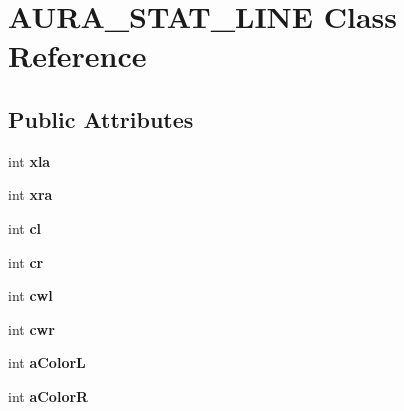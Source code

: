 \hypertarget{class_a_u_r_a___s_t_a_t___l_i_n_e}{\section{A\+U\+R\+A\+\_\+\+S\+T\+A\+T\+\_\+\+L\+I\+N\+E Class Reference}
\label{class_a_u_r_a___s_t_a_t___l_i_n_e}
}
\subsection*{Public Attributes}
\begin{DoxyCompactItemize}
\item 
\hypertarget{class_a_u_r_a___s_t_a_t___l_i_n_e_a42c234346457efdd753d71f9305fcf77}{int {\bfseries xla}}\label{class_a_u_r_a___s_t_a_t___l_i_n_e_a42c234346457efdd753d71f9305fcf77}

\item 
\hypertarget{class_a_u_r_a___s_t_a_t___l_i_n_e_a762bbdc4a68ca7a4840af6a0dde12bce}{int {\bfseries xra}}\label{class_a_u_r_a___s_t_a_t___l_i_n_e_a762bbdc4a68ca7a4840af6a0dde12bce}

\item 
\hypertarget{class_a_u_r_a___s_t_a_t___l_i_n_e_af89b81c9dd28cf19cf058790ebf2c531}{int {\bfseries cl}}\label{class_a_u_r_a___s_t_a_t___l_i_n_e_af89b81c9dd28cf19cf058790ebf2c531}

\item 
\hypertarget{class_a_u_r_a___s_t_a_t___l_i_n_e_a3815eba2e0521aa84067eda166157c7b}{int {\bfseries cr}}\label{class_a_u_r_a___s_t_a_t___l_i_n_e_a3815eba2e0521aa84067eda166157c7b}

\item 
\hypertarget{class_a_u_r_a___s_t_a_t___l_i_n_e_a99860ef5a6830df0434e8a5b77375845}{int {\bfseries cwl}}\label{class_a_u_r_a___s_t_a_t___l_i_n_e_a99860ef5a6830df0434e8a5b77375845}

\item 
\hypertarget{class_a_u_r_a___s_t_a_t___l_i_n_e_af9b2244cf6a0c15a355a49633b3d3a98}{int {\bfseries cwr}}\label{class_a_u_r_a___s_t_a_t___l_i_n_e_af9b2244cf6a0c15a355a49633b3d3a98}

\item 
\hypertarget{class_a_u_r_a___s_t_a_t___l_i_n_e_abec39aa811f1c49d36f0c1595e5b7f70}{int {\bfseries a\+Color\+L}}\label{class_a_u_r_a___s_t_a_t___l_i_n_e_abec39aa811f1c49d36f0c1595e5b7f70}

\item 
\hypertarget{class_a_u_r_a___s_t_a_t___l_i_n_e_af0e37277699b38ce40ce16fda5971940}{int {\bfseries a\+Color\+R}}\label{class_a_u_r_a___s_t_a_t___l_i_n_e_af0e37277699b38ce40ce16fda5971940}


\end{DoxyCompactItemize}
